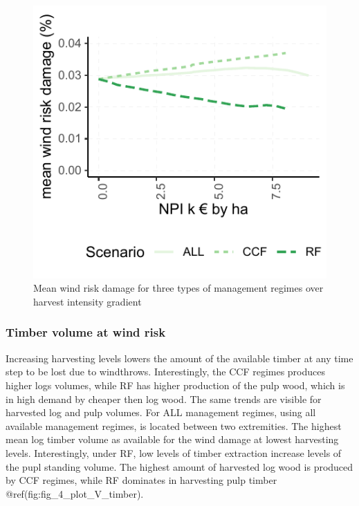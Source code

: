 \documentclass[]{elsarticle} %
\makeatletter
\def\maxwidth{\ifdim\Gin@nat@width>\linewidth\linewidth
\else\Gin@nat@width\fi}
\let\Oldincludegraphics\includegraphics
\renewcommand{\includegraphics}[1]{\Oldincludegraphics[width=\maxwidth]{#1}}
\makeatother
\begin{document}
\begin{figure}
\centering
\includegraphics{test_manus_files/figure-latex/fig3_mean_risk_by_intensity_plot-1.pdf}
\caption{Mean wind risk damage for three types of management regimes
over harvest intensity gradient}
\end{figure}

\subsubsection{Timber volume at wind
risk}\label{timber-volume-at-wind-risk}

Increasing harvesting levels lowers the amount of the available timber
at any time step to be lost due to windthrows. Interestingly, the CCF
regimes produces higher logs volumes, while RF has higher production of
the pulp wood, which is in high demand by cheaper then log wood. The
same trends are visible for harvested log and pulp volumes. For ALL
management regimes, using all available management regimes, is located
between two extremities. The highest mean log timber volume as available
for the wind damage at lowest harvesting levels. Interestingly, under
RF, low levels of timber extraction increase levels of the pupl standing
volume. The highest amount of harvested log wood is produced by CCF
regimes, while RF dominates in harvesting pulp timber
@ref(fig:fig\_4\_plot\_V\_timber).
\end{document}
